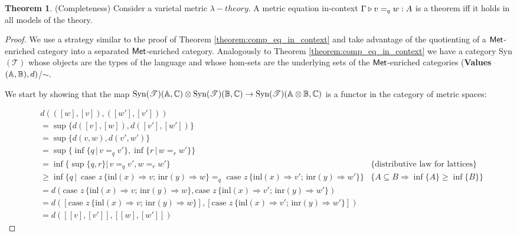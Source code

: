 \documentclass[10pt,a4paper]{amsart}
\theoremstyle{definition}
\theoremstyle{definition}
\theoremstyle{definition}
\theoremstyle{definition}
\theoremstyle{definition}
\theoremstyle{definition}
\newtheorem{theorem}[definition]{Theorem}
\begin{document}
\begin{theorem} (Completeness)
  Consider a varietal metric $\lambda-theory$. A metric equation
in-context $\Gamma \triangleright v =_q w : A$ is a theorem iff it holds in all models of the theory.
\end{theorem}
\begin{proof}
  We use a strategy similar to the proof of Theorem \ref{theorem:comp_eq_in_context} and take advantage of the quotienting of a  $\mathsf{Met}$-enriched category into a separated  $\mathsf{Met}$-enriched category. Analogously to Theorem \ref{theorem:comp_eq_in_context} we have a category Syn$(\mathscr{T})$ whose objects are the types of the language and whose hom-sets are the underlying sets of the  $\mathsf{Met}$-enriched categories (\textbf{Values}$(\mathbb{A},\mathbb{B}),d)$/$\sim$.

  We start by showing that the map $\text{Syn}(\mathscr{T})(\mathbb{A},\mathbb{C}) \otimes \text{Syn}(\mathscr{T})(\mathbb{B},\mathbb{C}) \rightarrow
  \text{Syn}(\mathscr{T})(\mathbb{A} \otimes \mathbb{B} ,\mathbb{C})$ is a functor in the category of metric spaces:

  \begin{align*}
    & d(([w], [v]), ([w′], [v']))  \\
    & = \sup{\{d([v],[w]),d([v'],[w']) \}}  \\
    & = \sup{\{d(v,w),d(v',w') \}} \\
    & = \sup {\{ \inf{\{q \, \vert \, v=_q v'\}},\inf{\{r \, \vert \, w=_r w'\}}  \}} \\
    & = \inf{\{ \sup \{ q, r \} \vert \, v=_q v', w=_r w' \}} & \{\text{distributive law for lattices}\} \\
    & \geq  \inf{ \{ q  \,\vert \, \text{ case } z \,   \{\text{inl} (x) \Rightarrow v ; \, \text{inr} (y) \Rightarrow w\} =_{q} \text{ case } z \,  \{\text{inl} (x) \Rightarrow v' ; \,\text{inr} (y) \Rightarrow w'\} \} } & \{ A \subseteq  B  \Rightarrow \inf{\{A\}} \geq \inf{\{B\}}  \} \\ 
    & = d(\text{case } z \,   \{\text{inl} (x) \Rightarrow v ; \, \text{inr} (y) \Rightarrow w\}, \text{case } z \,  \{\text{inl} (x) \Rightarrow v' ; \,\text{inr} (y) \Rightarrow w'\}) \\
    & = d([\text{case } z \,   \{\text{inl} (x) \Rightarrow v ; \, \text{inr} (y) \Rightarrow w\}], [\text{case } z \,  \{\text{inl} (x) \Rightarrow v' ; \,\text{inr} (y) \Rightarrow w'\}]) \\
    & = d([[v],[v']],[[w],[w']])  
  \end{align*}


\end{proof}
\end{document}
